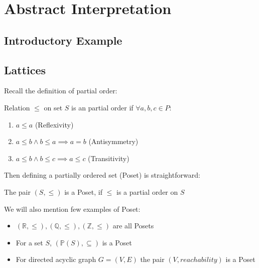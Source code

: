 \chapter{Abstract Interpretation}


\section{Introductory Example} %


\section{Lattices} %

Recall the definition of partial order:

\begin{defn}
    Relation $\leq$ on set $S$ is an partial order if $\forall a, b, c \in P$:
    \begin{enumerate}
        \item $a \leq a$ (Reflexivity)
        \item $a \leq b \land b \leq a \implies a = b$ (Antisymmetry)
        \item $a \leq b \land b \leq c \implies a \leq c$ (Transitivity)
    \end{enumerate}
\end{defn}

Then defining a partially ordered set (Poset) is straightforward:

\begin{defn}[Poset]
    The pair $(S, \leq)$ is a Poset, if $\leq$ is a partial order on $S$
\end{defn}

We will also mention few examples of Poset:

\begin{itemize}
    \item $(\mathbb{R}, \leq), (\mathbb{Q}, \leq), (\mathbb{Z}, \leq)$ are all Posets
    \item For a set $S$, $(\mathbb{P}(S), \subseteq)$ is a Poset
    \item For directed acyclic graph $G=(V,E)$ the pair $(V, reachability)$ is a Poset
\end{itemize}

